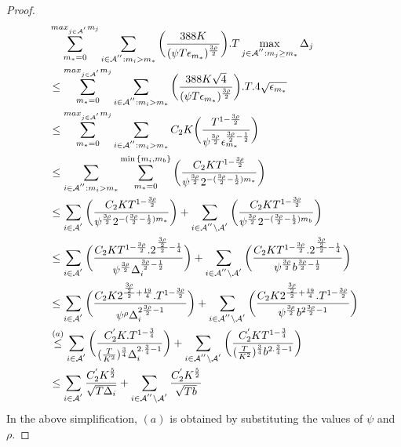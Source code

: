 \begin{proof}
\begin{align*}
&\sum_{m_{*}=0}^{max_{j\in \mathcal{A}^{'}}m_{j}}\sum_{i\in \mathcal{A}^{''}:m_{i}>m_{*}}\bigg(\dfrac{388 K}{(\psi  T\epsilon_{m_{*}})^{\frac{3\rho}{2}}} \bigg).T\max_{j\in \mathcal{A}^{''}:m_{j}\geq m_{*}}{\Delta}_{j}\\
&\leq\sum_{m_{*}=0}^{max_{j\in \mathcal{A}^{'}}m_{j}}\sum_{i\in \mathcal{A}^{''}:m_{i}>m_{*}}\bigg(\dfrac{388 K\sqrt{4}}{(\psi  T\epsilon_{m_{*}})^{\frac{3\rho}{2}}} \bigg).T.4\sqrt{\epsilon_{m_{*}}}\\
&\leq\sum_{m_{*}=0}^{max_{j\in \mathcal{A}^{'}}m_{j}}\sum_{i\in \mathcal{A}^{''}:m_{i}>m_{*}}C_2 K\bigg(\dfrac{T^{1-\frac{3\rho}{2}}}{\psi^{\frac{3\rho}{2}}\epsilon_{m_{*}}^{\frac{3\rho}{2}-\frac{1}{2}}} \bigg)\\
&\leq\sum_{i\in \mathcal{A}^{''}:m_{i}>m_{*}}\sum_{m_{*}=0}^{\min{\lbrace m_{i},m_{b}\rbrace}}\bigg(\dfrac{C_2 K T^{1-\frac{3\rho}{2}}}{\psi^{\frac{3\rho}{2}}2^{-(\frac{3\rho}{2} -\frac{1}{2})m_{*}}} \bigg)\\
&\leq\sum_{i\in \mathcal{A}^{'}}\bigg(\dfrac{C_2 K T^{1-\frac{3\rho}{2}}}{\psi^{\frac{3\rho}{2}}2^{-(\frac{3\rho}{2} -\frac{1}{2})m_{*}}} \bigg)+\sum_{i\in \mathcal{A}^{''}\setminus \mathcal{A}^{'}}\bigg(\dfrac{C_2 K T^{1-\frac{3\rho}{2} }}{\psi^{\frac{3\rho}{2}}2^{-(\frac{3\rho}{2} -\frac{1}{2})m_{b}}} \bigg)\\
&\leq\sum_{i\in \mathcal{A}^{'}}\bigg(\dfrac{C_2 K T^{1-\frac{3\rho}{2}}.2^{\frac{\frac{3\rho}{2}}{2}-\frac{1}{4}}}{\psi^{\frac{3\rho}{2}}\Delta_{i}^{\frac{3\rho}{2} -\frac{1}{2}}} \bigg)+\sum_{i\in \mathcal{A}^{''}\setminus \mathcal{A}^{'}}\bigg(\dfrac{C_2 K T^{1-\frac{3\rho}{2}}.2^{\frac{\frac{3\rho}{2}}{2}-\frac{1}{4}}}{\psi^{\frac{3\rho}{2}}b^{\frac{3\rho}{2} -\frac{1}{2}}} \bigg)\\
&\leq\sum_{i\in \mathcal{A}^{'}}\bigg(\dfrac{ C_2 K 2^{\frac{\frac{3\rho}{2}}{2}+\frac{19}{4}}.T^{1-\frac{3\rho}{2} } }{\psi^{\rho}\Delta_{i}^{2\frac{3\rho}{2} -1}} \bigg)+\sum_{i\in \mathcal{A}^{''}\setminus \mathcal{A}^{'}}\bigg(\dfrac{C_2 K 2^{\frac{\frac{3\rho}{2}}{2}+\frac{19}{4}}.T^{1-\frac{3\rho}{2}} }{\psi^{\frac{3\rho}{2} }b^{2\frac{3\rho}{2}-1}} \bigg)\\
&\overset{(a)}{\leq}\sum_{i\in \mathcal{A}^{'}}\bigg(\dfrac{C_2^{'} K .T^{1-\frac{3}{4}}}{(\frac{T}{K^2})^{\frac{3}{4}}\Delta_{i}^{2.\frac{3}{4} -1}} \bigg)+\sum_{i\in \mathcal{A}^{''}\setminus \mathcal{A}^{'}}\bigg(\dfrac{C_2^{'} K T^{1-\frac{3}{4}}}{(\frac{T}{K^2})^{\frac{3}{4}}b^{2.\frac{3}{4}-1}} \bigg)\\
&\leq\sum_{i\in \mathcal{A}^{'}}\dfrac{C_2^{'} K^{\frac{5}{2}}}{\sqrt{T\Delta_i}} +\sum_{i\in \mathcal{A}^{''}\setminus \mathcal{A}^{'}}\dfrac{C_2^{'} K^{\frac{5}{2}}}{\sqrt{T b}}
\end{align*}
In the above simplification, $(a)$ is obtained by substituting the values of $\psi$ and $\rho$.


\end{proof}
